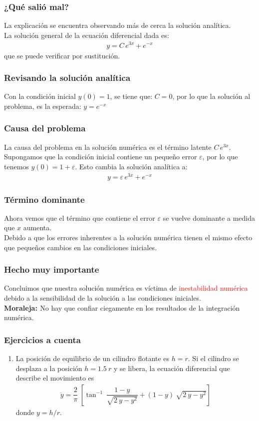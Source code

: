 \documentclass[12pt]{beamer}
\begin{document}
\begin{frame}
\frametitle{¿Qué salió mal?}
La explicación se encuentra observando más de cerca la solución analítica.
\\
\bigskip
\pause
La solución general de la ecuación diferencial dada es:
\pause
\begin{align*}
y = C \, e^{3 x} + e^{-x}
\end{align*}
que se puede verificar por sustitución.
\end{frame}
\begin{frame}
\frametitle{Revisando la solución analítica}
Con la condición inicial $y (0) = 1$, \pause se tiene que: $C = 0$, \pause por lo que la solución al problema, es la esperada: $y = e^{-x}$
\end{frame}
\begin{frame}
\frametitle{Causa del problema}
La causa del problema en la solución numérica es el término latente $C \, e^{3 x}$.
\\
\bigskip
\pause
Supongamos que la condición inicial contiene un pequeño error $\varepsilon$, por lo que tenemos $y (0) = 1 + \varepsilon$. \pause Esto cambia la solución analítica a:
\pause
\begin{align*}
y = \varepsilon \, e^{3 x} + e^{-x}
\end{align*}
\end{frame}
\begin{frame}
\frametitle{Término dominante}
Ahora vemos que el término que contiene el error $\varepsilon$ se vuelve dominante a medida que $x$ aumenta.
\\
\bigskip
\pause
Debido a que los errores inherentes a la solución numérica tienen el mismo efecto que pequeños cambios en las condiciones iniciales.
\end{frame}
\begin{frame}
\frametitle{Hecho muy importante}
Concluimos que nuestra solución numérica es víctima de \textcolor{red}{inestabilidad numérica} debido a la sensibilidad de la solución a las condiciones iniciales.
\\
\bigskip
\pause
\textbf{\textcolor{airforceblue}{Moraleja: }} No hay que confiar ciegamente en los resultados de la integración numérica.
\end{frame}
\begin{frame}
\frametitle{Ejercicios a cuenta}
\begin{enumerate}
\item La posición de equilibrio de un cilindro flotante es $h = r$. Si el cilindro se desplaza a la posición $h = 1.5 \: r$ y se libera, la ecuación diferencial que describe el movimiento es
\begin{align*}
\ddot{y} = \dfrac{2}{\pi} \: \left[ \tan^{-1} \: \dfrac{1 - y}{\sqrt{2 \: y - y^{2}}} + (1 - y) \: \sqrt{2 \: y - y^{2}} \right]
\end{align*}
donde $y = h / r$.
\seti 
\end{enumerate}
\end{frame}
\end{document}
